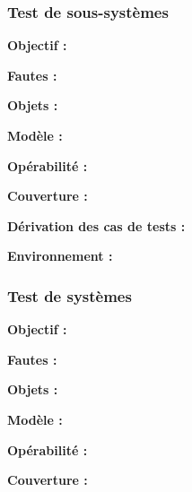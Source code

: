 \subsubsection{Test de sous-syst\`emes}
  
\textbf{Objectif :}
  
\par
  
\textbf{Fautes :}
  
\par
  
\textbf{Objets :}
  
\par
  
\textbf{Mod\`ele :}
  
\par
  
\textbf{Op\'erabilit\'e : }
  
\par
  
\textbf{Couverture :  }
  
\par
  
\textbf{D\'erivation des cas de tests :}
  
\par
  
\textbf{Environnement :}
  
\par
  
\subsubsection{Test de syst\`emes}
  
\textbf{Objectif :}
  
\par
  
\textbf{Fautes :}
  
\par
  
\textbf{Objets :}
  
\par
  
\textbf{Mod\`ele :}
  
\par
  
\textbf{Op\'erabilit\'e : }
  
\par
  
\textbf{Couverture :  }
  
\par
  
